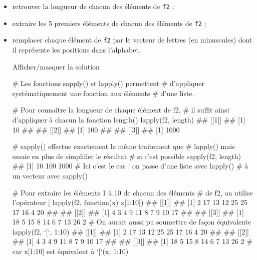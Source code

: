 \documentclass[12pt,]{article}
\newenvironment{Shaded}{}{}
\newcommand{\KeywordTok}[1]{\textcolor[rgb]{0.00,0.00,1.00}{{#1}}}
\newcommand{\DataTypeTok}[1]{{#1}}
\newcommand{\DecValTok}[1]{{#1}}
\newcommand{\StringTok}[1]{\textcolor[rgb]{0.00,0.50,0.50}{{#1}}}
\newcommand{\CommentTok}[1]{\textcolor[rgb]{0.00,0.50,0.00}{{#1}}}
\newcommand{\NormalTok}[1]{{#1}}
\begin{document}
\begin{itemize}
\item
  retrouver la longueur de chacun des éléments de \texttt{f2} ;
\item
  extraire les 5 premiers éléments de chacun des éléments de \texttt{f2}
  ;
\item
  remplacer chaque élément de \texttt{f2} par le vecteur de lettres (en
  minuscules) dont il représente les positions dans l'alphabet.

  Afficher/masquer la solution

  \hypertarget{sol24}{}
\begin{Shaded}
\begin{Highlighting}[]
\CommentTok{# Les fonctions sapply() et lapply() permettent }
\CommentTok{# d'appliquer systématiquement une fonction aux éléments}
\CommentTok{# d'une liste. }

\CommentTok{# Pour connaître la longueur de chaque élément de f2, }
\CommentTok{# il suffit ainsi d'appliquer à chacun la fonction length()}
\KeywordTok{lapply}\NormalTok{(f2, length)}
\NormalTok{## [[1]]}
\NormalTok{## [1] 10}
\NormalTok{## }
\NormalTok{## [[2]]}
\NormalTok{## [1] 100}
\NormalTok{## }
\NormalTok{## [[3]]}
\NormalTok{## [1] 1000}

\CommentTok{# sapply() effectue exactement le même traitement que}
\CommentTok{# lapply() mais essaie en plus de simplifier le résultat}
\CommentTok{# si c'est possible}
\KeywordTok{sapply}\NormalTok{(f2, length)}
\NormalTok{## [1]   10  100 1000}
\CommentTok{# Ici c'est le cas : on passe d'une liste avec lapply()}
\CommentTok{# à un vecteur avec sapply()}

\CommentTok{# Pour extraire les éléments 1 à 10 de chacun des éléments}
\CommentTok{# de f2, on utilise l'opérateur [}
\KeywordTok{lapply}\NormalTok{(f2, function(x) x[}\DecValTok{1}\NormalTok{:}\DecValTok{10}\NormalTok{])}
\NormalTok{## [[1]]}
\NormalTok{##  [1]  2 17 13 12 25 25 17 16  4 20}
\NormalTok{## }
\NormalTok{## [[2]]}
\NormalTok{##  [1]  4  3  4  9 11  8  7  9 10 17}
\NormalTok{## }
\NormalTok{## [[3]]}
\NormalTok{##  [1] 18  5 15  8 14  6  7 13 26  2}
\CommentTok{# On aurait aussi pu soumettre de façon équivalente }
\KeywordTok{lapply}\NormalTok{(f2, }\StringTok{`}\DataTypeTok{[}\StringTok{`}\NormalTok{, }\DecValTok{1}\NormalTok{:}\DecValTok{10}\NormalTok{)}
\NormalTok{## [[1]]}
\NormalTok{##  [1]  2 17 13 12 25 25 17 16  4 20}
\NormalTok{## }
\NormalTok{## [[2]]}
\NormalTok{##  [1]  4  3  4  9 11  8  7  9 10 17}
\NormalTok{## }
\NormalTok{## [[3]]}
\NormalTok{##  [1] 18  5 15  8 14  6  7 13 26  2}
\CommentTok{# car x[1:10] est équivalent à `[`(x, 1:10)}


\end{Highlighting}
\end{Shaded}
\end{itemize}
\end{document}
